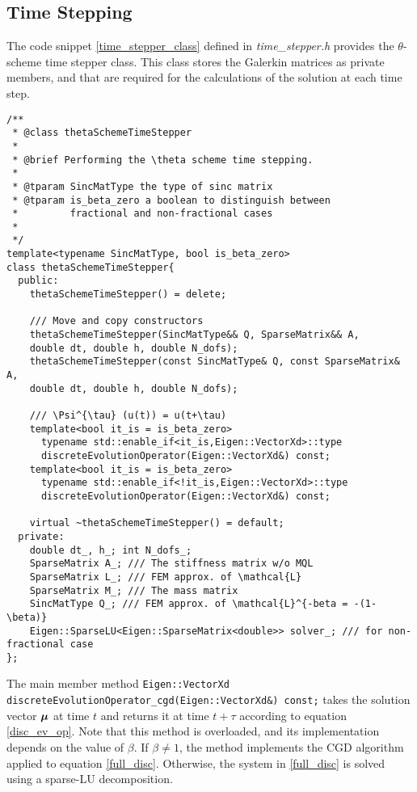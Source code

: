 \subsection{Time Stepping}
The code snippet \ref{time_stepper_class} defined in \textit{time\_stepper.h} provides the $\theta$-scheme time stepper class. This class stores the Galerkin matrices as private members, and that are required for the calculations of the solution at each time step.  
\begin{lstlisting}[caption={Time stepper class.}, label={time_stepper_class}]
/**
 * @class thetaSchemeTimeStepper
 *
 * @brief Performing the \theta scheme time stepping.
 *
 * @tparam SincMatType the type of sinc matrix
 * @tparam is_beta_zero a boolean to distinguish between 
 *         fractional and non-fractional cases
 *
 */
template<typename SincMatType, bool is_beta_zero> 
class thetaSchemeTimeStepper{
  public: 
    thetaSchemeTimeStepper() = delete;

    /// Move and copy constructors 
    thetaSchemeTimeStepper(SincMatType&& Q, SparseMatrix&& A, 
	double dt, double h, double N_dofs);
    thetaSchemeTimeStepper(const SincMatType& Q, const SparseMatrix& A, 
	double dt, double h, double N_dofs);

    /// \Psi^{\tau} (u(t)) = u(t+\tau)
    template<bool it_is = is_beta_zero>
      typename std::enable_if<it_is,Eigen::VectorXd>::type
      discreteEvolutionOperator(Eigen::VectorXd&) const; 
    template<bool it_is = is_beta_zero>
      typename std::enable_if<!it_is,Eigen::VectorXd>::type 
      discreteEvolutionOperator(Eigen::VectorXd&) const;

    virtual ~thetaSchemeTimeStepper() = default;
  private: 
    double dt_, h_; int N_dofs_;  
    SparseMatrix A_; /// The stiffness matrix w/o MQL
    SparseMatrix L_; /// FEM approx. of \mathcal{L}
    SparseMatrix M_; /// The mass matrix
    SincMatType Q_; /// FEM approx. of \mathcal{L}^{-beta = -(1-\beta)}
    Eigen::SparseLU<Eigen::SparseMatrix<double>> solver_; /// for non-fractional case
};
\end{lstlisting}
The main member method \lstinline{Eigen::VectorXd discreteEvolutionOperator_cgd(Eigen::VectorXd&) const;} takes the solution vector $\bm{\mu}$ at time $t$ and returns it at time $t+\tau$ according to equation \eqref{disc_ev_op}. Note that this method is overloaded, and its implementation depends on the value of $\beta$. If $\beta \neq 1$, the method implements the CGD algorithm applied to equation \eqref{full_disc}. Otherwise, the system in \eqref{full_disc} is solved using a sparse-LU decomposition.\\
